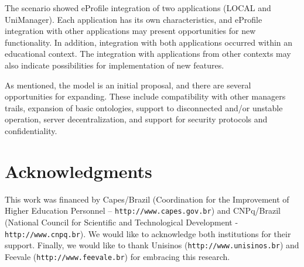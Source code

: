 \documentclass[preprint,authoryear,12pt,dvipdfm]{elsarticle}
\begin{document}
The scenario showed eProfile integration of two applications (LOCAL and UniManager). Each application has its own characteristics, and eProfile integration with other applications may present opportunities for new functionality. In addition, integration with both applications occurred within an educational context. The integration with applications from other contexts may also indicate possibilities for implementation of new features.

As mentioned, the model is an initial proposal, and there are several opportunities for expanding. These include compatibility with other managers trails, expansion of basic ontologies, support to disconnected and/or unstable operation, server decentralization, and support for security protocols and confidentiality.


\section*{Acknowledgments}

This work was financed by Capes/Brazil (Coordination for the Improvement of Higher Education Personnel -- \texttt{http://www.capes.gov.br}) and  CNPq/Brazil (National Council for Scientific and Technological Development - \texttt{http://www.cnpq.br}). We would like to acknowledge both institutions for their support. Finally, we would like to thank Unisinos (\texttt{http://www.unisinos.br}) and Feevale (\texttt{http://www.feevale.br}) for embracing this research.



\end{document}
